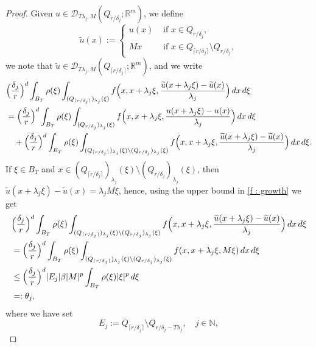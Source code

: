 \documentclass[10pt,a4paper]{amsart}
\newcommand{\N}{\mathbb{N}}
\newcommand{\R}{\mathbb{R}}
\newcommand{\dej}{\delta_j}
\begin{document}
\begin{proof}
Given $u\in \mathcal{D}_{T\lambda_j,M}(Q_{r/\dej}; \R^m)$, we define
\begin{equation*}
    \widetilde{u}(x):=
    \begin{cases}
        u(x) & \text{ if } x\in Q_{r/\dej}, \\
        Mx & \text{ if } x\in Q_{\lceil r/\dej\rceil}\setminus Q_{r/\dej},
    \end{cases}
\end{equation*}
we note that $\widetilde{u}\in \mathcal{D}_{T\lambda_j,M}(Q_{\lceil r/\dej\rceil}; \R^m)$, and we write
\begin{align*}
    &\Bigl(\frac{\dej}{r}\Bigr)^d\int_{B_T} \rho(\xi)\int_{(Q_{\lceil r/\dej \rceil })_{\lambda_j}(\xi)} f\Bigl(x, x+\lambda_j\xi, \frac{\widetilde{u}(x+\lambda_j\xi)-\widetilde{u}(x)}{\lambda_j}\Bigr)\, dx\,d\xi \\
    & = \Bigl(\frac{\dej}{r}\Bigr)^d\int_{B_T} \rho(\xi)\int_{(Q_{r/\dej})_{\lambda_j}(\xi)} f\Bigl(x, x+\lambda_j\xi, \frac{u(x+\lambda_j\xi)-u(x)}{\lambda_j}\Bigr)\, dx\,d\xi \\
    & \quad + \Bigl(\frac{\dej}{r}\Bigr)^d\int_{B_T} \rho(\xi)\int_{(Q_{\lceil r/\dej \rceil })_{\lambda_j}(\xi) \setminus (Q_{r/\dej})_{\lambda_j}(\xi)} f\Bigl(x, x+\lambda_j\xi, \frac{\widetilde{u}(x+\lambda_j\xi)-\widetilde{u}(x)}{\lambda_j}\Bigr)\, dx\,d\xi.
\end{align*}
If $\xi\in B_T$ and $x\in (Q_{\lceil r/\dej \rceil })_{\lambda_j}(\xi) \setminus (Q_{r/\dej})_{\lambda_j}(\xi)$, then $\widetilde{u}(x+\lambda_j\xi)-\widetilde{u}(x)=\lambda_j M\xi$, hence, using the upper bound in \eqref{f : growth} we get
\begin{align} \nonumber
 & \Bigl(\frac{\dej}{r}\Bigr)^d\int_{B_T} \rho(\xi)\int_{(Q_{\lceil r/\dej \rceil })_{\lambda_j}(\xi) \setminus (Q_{r/\dej})_{\lambda_j}(\xi)} f\Bigl(x, x+\lambda_j\xi, \frac{\widetilde{u}(x+\lambda_j\xi)-\widetilde{u}(x)}{\lambda_j}\Bigr)\, dx\,d\xi \\ \nonumber
    & = \Bigl(\frac{\dej}{r}\Bigr)^d\int_{B_T} \rho(\xi)\int_{(Q_{\lceil r/\dej \rceil })_{\lambda_j}(\xi) \setminus (Q_{r/\dej})_{\lambda_j}(\xi)} f(x, x+\lambda_j\xi, M\xi)\, dx\,d\xi \\ \nonumber
    & \leq  \Bigl(\frac{\dej}{r}\Bigr)^d|E_j|\beta|M|^p\int_{B_T} \rho(\xi)|\xi|^p \, d\xi \\ \nonumber
    & =: \theta_j,
\end{align}
where we have set
\begin{equation}\label{set}
    E_j:=Q_{\lceil r/\dej \rceil } \setminus Q_{r/\dej-T\lambda_j}, \quad j\in\N,

\end{equation}
\end{proof}
\end{document}
